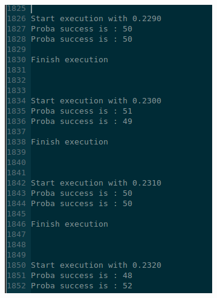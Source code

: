 \begin{figure}
    \centering
    \begin{subfigure}[b]{0.3\textwidth}
        \includegraphics[width=\textwidth]{img/code.png}
        \label{fig:gull}
    \end{subfigure}
    ~ %
    \begin{subfigure}[b]{0.3\textwidth}

\end{subfigure}
\end{figure}
